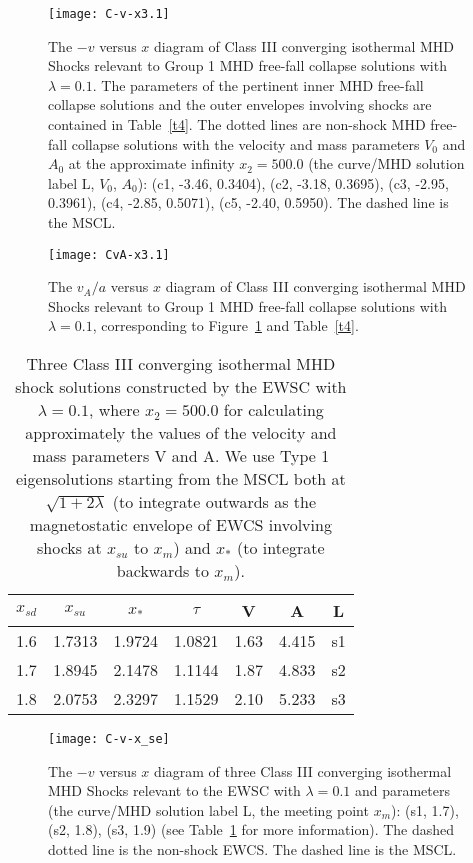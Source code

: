 \documentclass[fleqn,usenatbib]{mnras}
\begin{document}
\begin{figure}
\centering
\texttt{[image: C-v-x3.1]}
\caption{The $-v$ versus $x$ diagram of Class III converging isothermal MHD Shocks relevant to Group 1 MHD free-fall collapse solutions with $\lambda=0.1$. The parameters of the pertinent inner MHD free-fall collapse solutions and the outer envelopes involving shocks are contained in Table~\ref{t4}. The dotted lines are non-shock MHD free-fall collapse solutions with the velocity and mass parameters $V_{0}$ and $A_{0}$ at the approximate infinity $x_{2}=500.0$ (the curve/MHD solution label L, $V_{0}$, $A_{0}$): (c1, -3.46, 0.3404), (c2, -3.18, 0.3695), (c3, -2.95, 0.3961), (c4, -2.85, 0.5071), (c5, -2.40, 0.5950). The dashed line is the MSCL.}
\label{16}
\end{figure}

\begin{figure}
\centering
\texttt{[image: CvA-x3.1]}
\caption{The $v_{A}/a$ versus $x$ diagram of Class III converging isothermal MHD Shocks relevant to Group 1 MHD free-fall collapse solutions with $\lambda=0.1$, corresponding to Figure~\ref{16} and Table~\ref{t4}.}
\label{17}
\end{figure}

\begin{table}
\centering
\caption{Three Class III converging isothermal MHD shock solutions constructed by the EWSC with $\lambda=0.1$, where $x_{2}=500.0$ for calculating approximately the values of the velocity and mass parameters V and A. We use Type 1 eigensolutions starting from the MSCL both at $\sqrt{1+2\lambda}$ (to integrate outwards as the magnetostatic envelope of EWCS involving shocks at $x_{su}$ to $x_{m}$) and $x_{*}$ (to integrate backwards to $x_{m}$).}
\begin{tabular}{ccccccc}
\hline
$x_{sd}$ & $x_{su}$ & $x_{*}$ & $\tau$ & V & A & L\\
\hline
1.6 & 1.7313 & 1.9724 & 1.0821 & 1.63 & 4.415 & s1 \\
1.7 & 1.8945 & 2.1478 & 1.1144 & 1.87 & 4.833 & s2 \\
1.8 & 2.0753 & 2.3297 & 1.1529 & 2.10 & 5.233 & s3 \\
\hline
\end{tabular}
\label{tse}
\end{table}


\begin{figure}
\centering
\texttt{[image: C-v-x\_se]}
\caption{The $-v$ versus $x$ diagram of three Class III converging isothermal MHD Shocks relevant to the EWSC with $\lambda=0.1$ and parameters (the curve/MHD solution label L, the meeting point $x_{m}$): (s1, 1.7), (s2, 1.8), (s3, 1.9) (see Table~\ref{tse} for more information). The dashed dotted line is the non-shock EWCS. The dashed line is the MSCL.}
\label{se}
\end{figure}
\end{document}
